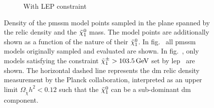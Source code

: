 \begin{figure}[h]
\begin{subfigure}[b]{0.49\linewidth}
		\caption{With LEP constraint\label{fig:relic_density_lsp_constraint}}
	\end{subfigure}\hfill
	\caption{Density of the \gls{pmssm} model points sampled in the plane spanned by the relic density and the $\tilde{\chi}_1^0$ mass. The model points are additionally shown as a function of the nature of their $\tilde{\chi}_1^0$. In fig.~ all \gls{pmssm} models originally sampled and evaluated are shown. In fig.~, only models satisfying the constraint $\charg > \SI{103.5}{\GeV}$ set by \gls{lep}~\cite{lep_susy_results} are shown. The horizontal dashed line represents the \gls{dm} relic density measurement by the Planck collaboration, interpreted as an upper limit $\Omega_{\tilde{\chi}} h^2 < 0.12$ such that the $\tilde{\chi}_1^0$ can be a sub-dominant \gls{dm} component.}
	\label{fig:relic_density_lsp_withConstraint}
\end{figure}
